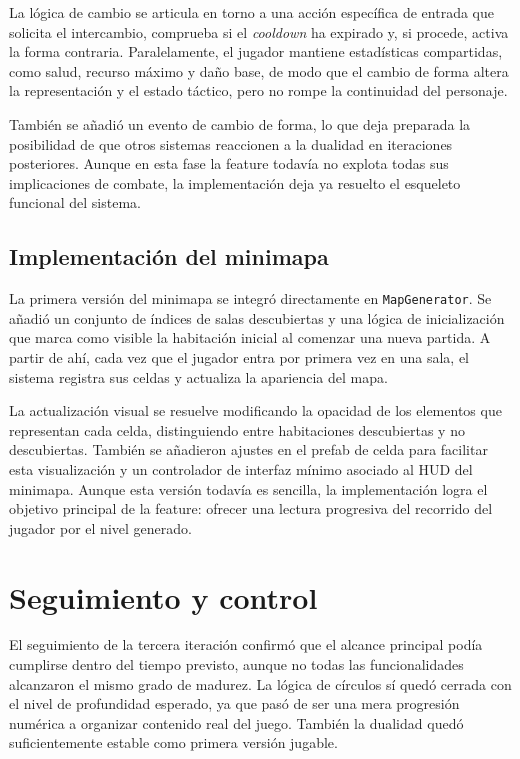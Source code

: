La lógica de cambio se articula en torno a una acción específica de entrada que solicita el
intercambio, comprueba si el \textit{cooldown} ha expirado y, si procede, activa la forma
contraria. Paralelamente, el jugador mantiene estadísticas compartidas, como salud,
recurso máximo y daño base, de modo que el cambio de forma altera la representación y el
estado táctico, pero no rompe la continuidad del personaje.

También se añadió un evento de cambio de forma, lo que deja preparada la posibilidad de que
otros sistemas reaccionen a la dualidad en iteraciones posteriores. Aunque en esta fase la
feature todavía no explota todas sus implicaciones de combate, la implementación deja ya
resuelto el esqueleto funcional del sistema.

\subsection{Implementación del minimapa}
La primera versión del minimapa se integró directamente en \texttt{MapGenerator}. Se añadió
un conjunto de índices de salas descubiertas y una lógica de inicialización que marca como
visible la habitación inicial al comenzar una nueva partida. A partir de ahí, cada vez que
el jugador entra por primera vez en una sala, el sistema registra sus celdas y actualiza la
apariencia del mapa.

La actualización visual se resuelve modificando la opacidad de los elementos que representan
cada celda, distinguiendo entre habitaciones descubiertas y no descubiertas. También se
añadieron ajustes en el prefab de celda para facilitar esta visualización y un controlador
de interfaz mínimo asociado al HUD del minimapa. Aunque esta versión todavía es sencilla,
la implementación logra el objetivo principal de la feature: ofrecer una lectura progresiva
del recorrido del jugador por el nivel generado.

\section{Seguimiento y control}
El seguimiento de la tercera iteración confirmó que el alcance principal podía cumplirse dentro
del tiempo previsto, aunque no todas las funcionalidades alcanzaron el mismo grado de madurez.
La lógica de círculos sí quedó cerrada con el nivel de profundidad esperado, ya que pasó de ser
una mera progresión numérica a organizar contenido real del juego. También la dualidad quedó
 suficientemente estable como primera versión jugable.


